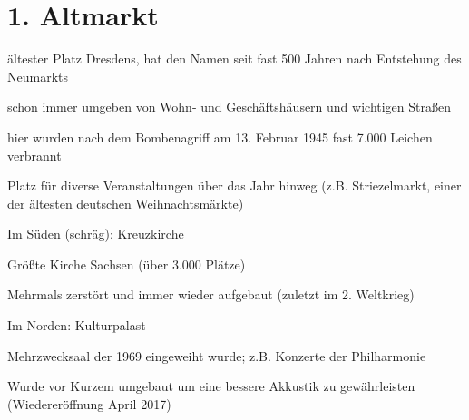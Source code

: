 \documentclass[a4paper,12pt]{report}
\begin{document}
\section{1. Altmarkt}
\begin{itemize*}
\item ältester Platz Dresdens, hat den Namen seit fast 500 Jahren nach Entstehung des Neumarkts
\item schon immer umgeben von Wohn- und Geschäftshäusern und wichtigen Straßen
\item hier wurden nach dem Bombenagriff am 13. Februar 1945 fast 7.000 Leichen verbrannt
\item Platz für diverse Veranstaltungen über das Jahr hinweg (z.B. Striezelmarkt, einer der ältesten deutschen Weihnachtsmärkte)
\item Im Süden (schräg): Kreuzkirche
    \begin{itemize*}
    \item Größte Kirche Sachsen (über 3.000 Plätze)
    \item Mehrmals zerstört und immer wieder aufgebaut (zuletzt im 2. Weltkrieg)
    \end{itemize*}
\item Im Norden: Kulturpalast
    \begin{itemize*}
    \item Mehrzwecksaal der 1969 eingeweiht wurde; z.B. Konzerte der Philharmonie
    \item Wurde vor Kurzem umgebaut um eine bessere Akkustik zu gewährleisten (Wiedereröffnung April 2017)
    \end{itemize*}
\end{itemize*}
\end{document}
